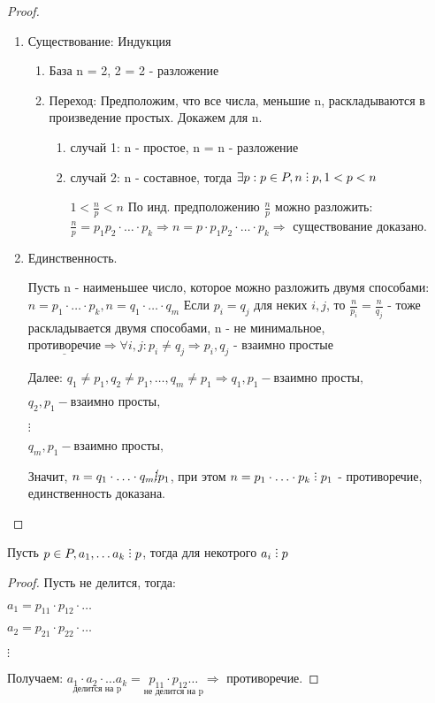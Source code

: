 \begin{proof}
  
  \begin{enumerate}
    \item Существование: Индукция
    
    \begin{enumerate}
      \item База n = 2, 2 = 2 - разложение
      \item Переход: Предположим, что все числа, меньшие n, раскладываются в произведение простых. Докажем для n.
      
      \begin{enumerate}
        \item случай 1: n - простое, n = n - разложение
        \item случай 2: n - составное, тогда $\exists p: p \in P, n \divby p, 1 < p < n$
        
        $1 < \frac{n}{p} < n$ По инд. предположению $\frac{n}{p}$ можно разложить: $\frac{n}{p} = p_1p_2 \cdot \ldots \cdot p_k \Rightarrow n = p \cdot p_1p_2 \cdot \ldots \cdot p_k \Rightarrow$ существование доказано.
        
      \end{enumerate}
    \end{enumerate}
    \item Единственность.
    
    Пусть n - наименьшее число, которое можно разложить двумя способами:
    $n = p_1 \cdot \ldots \cdot p_k, n = q_1 \cdot \ldots \cdot q_m$ Если $p_i = q_j$ для неких $i, j$, то $\frac{n}{p_i} = \frac{n}{q_j}$ - тоже раскладывается двумя способами, n - не минимальное, $\underline{\text{противоречие}} \Rightarrow \forall i, j: p_i \neq q_j \Rightarrow p_i, q_j$  - взаимно простые
    
    Далее: $q_1 \neq p_1, q_2 \neq p_1, \ldots, q_m \neq p_1 \Rightarrow q_1, p_1 - \text{взаимно просты},$

    $q_2, p_1 - \text{взаимно просты},$

    $\vdots$

    $q_m, p_1 - \text{взаимно просты},$

    Значит, $n = q_1 \cdot \ldots \cdot q_m \cancel{\divby} p_1$, при этом $n = p_1 \cdot \ldots \cdot p_k \divby p_1$ - противоречие, единственность доказана.
  \end{enumerate}
\end{proof}

\begin{property} 
  Пусть $p \in P, a_1, \ldots a_k \divby p$, тогда для некотрого $a_i \divby p$
\end{property}

\begin{proof}
  Пусть не делится, тогда:

  $a_1 = p_{11} \cdot p_{12} \cdot \ldots$

  $a_2 = p_{21} \cdot p_{22} \cdot \ldots$

  $\vdots$

  Получаем: $\underset{\text{делится на p}}{a_1 \cdot a_2 \cdot \ldots a_k} = \underset{\text{не делится на p}}{p_{11} \cdot p_{12} \ldots} \Rightarrow$ противоречие. 
\end{proof}
